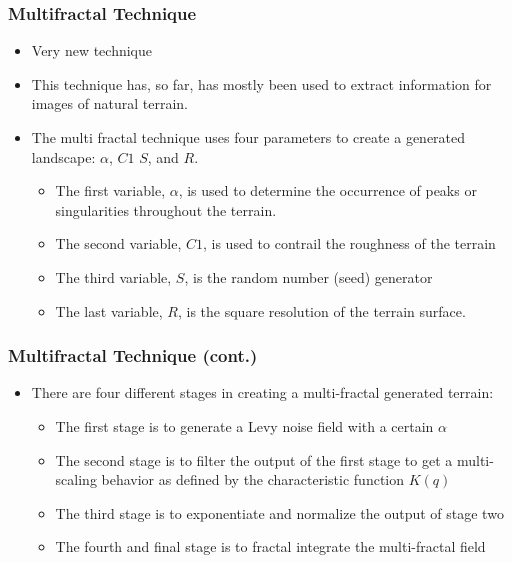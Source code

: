 \documentclass{beamer}
\begin{document}
\begin{frame}
 \frametitle{Multifractal Technique}
\begin{itemize}
\item Very new technique
\item This technique has, so far, has mostly been used to extract information for images of natural terrain. 
\item The multi fractal technique uses four parameters to create a generated landscape: $\alpha$, $C1$ $S$, and $R$. 
\begin{itemize}
\item The first variable, $\alpha$, is used to determine the occurrence of peaks or singularities throughout the terrain.
\item The second variable, $C1$, is used to contrail the roughness of the terrain
\item The third variable, $S$, is the random number (seed) generator
\item The last variable, $R$, is the square resolution of the terrain surface.
\end{itemize}
\end{itemize}
\end{frame}


\begin{frame}
\frametitle{Multifractal Technique (cont.)}
\begin{itemize}
\item There are four different stages in creating a multi-fractal generated terrain:
\begin{itemize}
\item The first stage is to generate a Levy noise field with a certain $\alpha$
\item The second stage is to filter the output of the first stage to get a multi-scaling behavior as defined by the characteristic function $K(q)$
\item The third stage is to exponentiate and normalize the output of stage two
\item The fourth and final stage is to fractal integrate the multi-fractal field
\end{itemize}
\end{itemize}
\end{frame}
\end{document}

